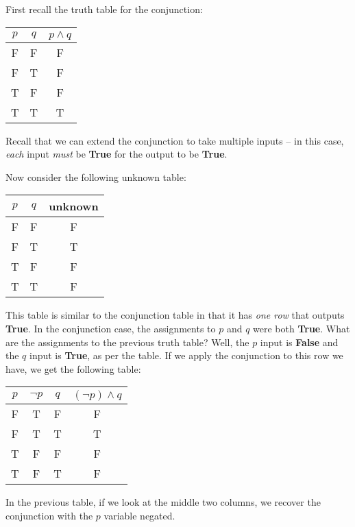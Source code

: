 \documentclass[main.tex]{subfiles}
\begin{document}
\begin{example}
	First recall the truth table for the conjunction:
	
	\begin{center}
		\begin{tabular}{cc|c}
			\(p\) & \(q\) & \(p \land q\) \\
			\hline
			F & F & F \\
			F & T & F \\
			T & F & F \\
			T & T & T
		\end{tabular}
	\end{center}
	
	Recall that we can extend the conjunction to take multiple inputs -- in this case, \textit{each} input \textit{must} be \textbf{True} for the output to be \textbf{True}.
	
	Now consider the following unknown table:
	
	\begin{center}
		\begin{tabular}{cc|c}
			\(p\) & \(q\) & unknown \\
			\hline
			F & F & F \\
			F & T & T \\
			T & F & F \\
			T & T & F
		\end{tabular}
	\end{center}
	
	This table is similar to the conjunction table in that it has \textit{one row} that outputs \textbf{True}. In the conjunction case, the assignments to \(p\) and \(q\) were both \textbf{True}. What are the assignments to the previous truth table? Well, the \(p\) input is \textbf{False} and the \(q\) input is \textbf{True}, as per the table. If we apply the conjunction to this row we have, we get the following table:
	
	\begin{center}
		\begin{tabular}{c|c|c|c}
			\(p\) & \(\lnot p\) & \(q\) & \((\lnot p) \land q\) \\
			\hline
			F & T & F & F \\
			F & T & T & T \\
			T & F & F & F \\
			T & F & T & F
		\end{tabular}
	\end{center}
	
	In the previous table, if we look at the middle two columns, we recover the conjunction with the \(p\) variable negated.
\end{example}
\end{document}
